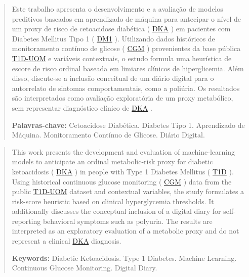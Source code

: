\documentclass[12pt,a4paper]{article}
\DeclareRobustCommand{\sigla}[1]{%
    \texorpdfstring{\hyperlink{sigla:#1}{#1}}{#1}%
}
\begin{document}
\begin{abstract}

\vspace{1cm}
\singlespacing
Este trabalho apresenta o desenvolvimento e a avaliação de modelos preditivos baseados em aprendizado de máquina para antecipar o nível de um proxy de risco de cetoacidose diabética (\sigla{DKA}) em pacientes com Diabetes Mellitus Tipo 1 (\sigla{DM1}). Utilizando dados históricos de monitoramento contínuo de glicose (\sigla{CGM}) provenientes da base pública \sigla{T1D-UOM} e variáveis contextuais, o estudo formula uma heurística de escore de risco ordinal baseada em limiares clínicos de hiperglicemia. Além disso, discute-se a inclusão conceitual de um diário digital para o autorrelato de sintomas comportamentais, como a poliúria. Os resultados são interpretados como avaliação exploratória de um proxy metabólico, sem representar diagnóstico clínico de \sigla{DKA}.

\vspace{0.5cm}

\noindent \textbf{Palavras-chave:} Cetoacidose Diabética. Diabetes Tipo 1. Aprendizado de Máquina. Monitoramento Contínuo de Glicose. Diário Digital.
\end{abstract}

\newpage

\renewcommand{\abstractname}{Abstract}
\begin{abstract}


\vspace{1cm}
\singlespacing
This work presents the development and evaluation of machine-learning models to anticipate an ordinal metabolic-risk proxy for diabetic ketoacidosis (\sigla{DKA}) in people with Type 1 Diabetes Mellitus (\sigla{T1D}). Using historical continuous glucose monitoring (\sigla{CGM}) data from the public \sigla{T1D-UOM} dataset and contextual variables, the study formulates a risk-score heuristic based on clinical hyperglycemia thresholds. It additionally discusses the conceptual inclusion of a digital diary for self-reporting behavioral symptoms such as polyuria. The results are interpreted as an exploratory evaluation of a metabolic proxy and do not represent a clinical \sigla{DKA} diagnosis.

\vspace{0.5cm}
\noindent \textbf{Keywords:} Diabetic Ketoacidosis. Type 1 Diabetes. Machine Learning. Continuous Glucose Monitoring. Digital Diary.

\end{abstract}
\end{document}
